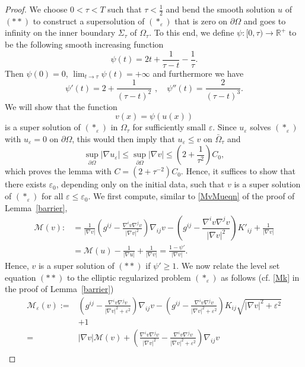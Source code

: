 \documentclass[11pt]{amsart}
\renewcommand{\epsilon}{\varepsilon}
\def\R{\mathbb{R}}
\def\e{\epsilon}
\def\t{\tau}
\begin{document}
\begin{proof}
We choose $0<\t<T$ such that $\t<\frac{1}{2}$ and bend the smooth solution $u$ of $(**)$ to construct a supersolution of $(*_{\varepsilon})$ that is zero on $\partial\Omega$ and goes to infinity on the inner boundary $\Sigma_{\tau}$ of $\Omega_{\tau}$. To this end, we define $\psi:[0, \tau)\to \R^+$ to be the following smooth increasing function
\begin{equation}\label{psidelta}
\psi(t)=2t+\frac{1}{\t-t}-\frac{1}{\t}.
\end{equation}
Then $\psi(0)=0$, $\lim_{t\to\t}\psi(t)=+\infty$ and furthermore we have
\begin{equation}\label{Dpsidelta}
\psi'(t)=2+\frac{1}{(\t-t)^2}\,\,,\quad \psi''(t)=\frac{2}{(\t-t)^3}.
\end{equation}
We will show that the function 
\[v(x)=\psi(u(x))\]
is a super solution of $(*_{\varepsilon})$ in $\Omega_\tau$ for sufficiently small  $\e$. Since $u_{\varepsilon}$ solves $(*_{\varepsilon})$ with $u_\e=0$ on $\partial \Omega$, this would then imply that $u_{\varepsilon}\leq v$ on $\bar{\Omega}_{\tau}$ and
\[ \sup_{\partial \Omega}|\nabla u_\e|\le \sup_{\partial \Omega}|\nabla v|\le \left(2+\frac{1}{\t^2}\right) C_0,\]
which proves the lemma with $C=(2+\tau^{-2})C_0$.
Hence, it suffices to show that there exists $\e_0$, depending only on the initial data, such that $v$ is a super solution of $(*_{\varepsilon})$ for all $\e\le \e_0$. 
We first compute, similar to \eqref{MvMueqn} of the proof of Lemma~\ref{barrier},
\[\begin{split}\mathcal M(v):&= \frac{1}{|\nabla v|}\left(g^{ij}-\frac{\nabla^iv\nabla^jv}{|\nabla v|^2}\right)\nabla_{ij}v-\left(g^{ij}-\dfrac{\nabla^iv \nabla^j v}{|\nabla v|^2}\right)K'_{ij}+\frac{1}{|\nabla v|}\\
&=\mathcal M(u)-\frac{1}{|\nabla u|}+\frac{1}{|\nabla v|}=\frac{1-\psi'}{|\nabla v|}.
\end{split}\]
Hence, $v$ is a super solution of $(**)$ if $\psi'\ge 1$. We now relate the level set equation $(**)$ to the elliptic regularized problem $(*_{\varepsilon})$ as follows (cf. \eqref{Mk} in the proof of Lemma~\ref{barrier})
\begin{equation}\label{Mev}
\begin{split}
\mathcal{M}_{\varepsilon}(v):=&\left(g^{ij}-\frac{\nabla^i v\nabla^j v}{|\nabla v|^2+\e^2}\right)\nabla_{ij}v-\left(g^{ij}- \frac{\nabla^i v\nabla^j v}{|\nabla v|^2+\e^2}\right) K_{ij}\sqrt{|\nabla v|^2+\e^2}\\
&+1\\
=&|\nabla v|\mathcal M(v)+ \left(\frac{\nabla^i v\nabla^j v}{|\nabla v|^2}-\frac{\nabla^i v\nabla^j v}{|\nabla v|^2+\e^2}\right)\nabla_{ij}v \\

\end{split}
\end{equation}
\end{proof}
\end{document}
